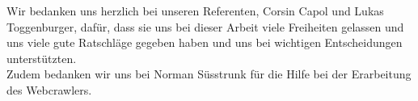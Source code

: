 Wir bedanken uns herzlich bei unseren Referenten, Corsin Capol und Lukas Toggenburger, dafür, dass sie uns bei dieser Arbeit viele Freiheiten gelassen und uns viele gute Ratschläge gegeben haben und uns bei wichtigen Entscheidungen unterstützten.\\
Zudem bedanken wir uns bei Norman Süsstrunk für die Hilfe bei der Erarbeitung des Webcrawlers.